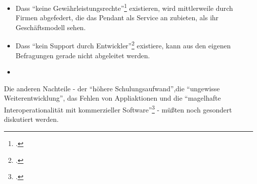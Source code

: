 \documentclass[DIV=calc,BCOR=5mm,11pt,headings=small,oneside,abstract=true, toc=bib]{scrartcl}
\begin{document}
\begin{itemize}
  \item Dass \enquote{keine
  Gewährleistungsrechte}\footcite[vgl.][17]{RenVetRexKet2005a} existieren,
  wird mittlerweile durch Firmen abgefedert, die das Pendant als Service an
  zubieten, als ihr Geschäftsmodell sehen.
  \item Dass \enquote{kein
  Support durch Entwickler}\footcite[vgl.][17]{RenVetRexKet2005a} existiere, kann
  aus den eigenen Befragungen gerade nicht abgeleitet werden.
  \item 
\end{itemize}

Die anderen Nachteile - der \enquote{höhere Schulungsaufwand},die 
\enquote{ungewisse Weiterentwicklung}, das Fehlen von Appliaktionen und die
\enquote{magelhafte Interoperationalität mit kommerzieller
Software}\footcite[vgl.][18]{RenVetRexKet2005a} - müßten noch gesondert diskutiert
werden.
\small

\end{document}
